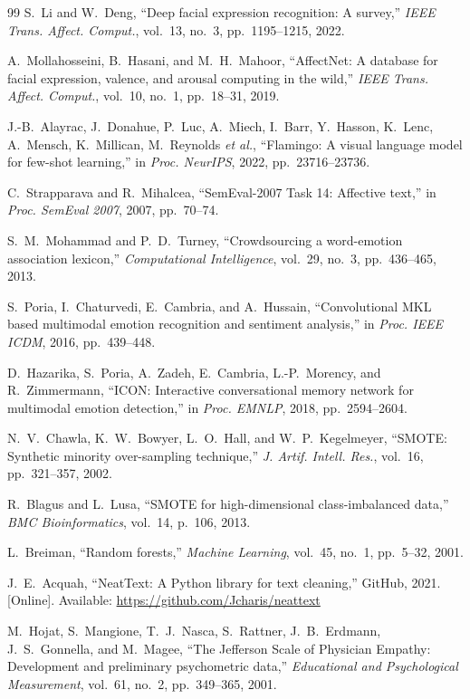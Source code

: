 \documentclass[conference]{IEEEtran}
\begin{document}
\begin{thebibliography}{99}
S.~Li and W.~Deng,
``Deep facial expression recognition: A survey,''
\textit{IEEE Trans. Affect. Comput.}, vol.~13, no.~3,
pp.~1195--1215, 2022.

A.~Mollahosseini, B.~Hasani, and M.~H.~Mahoor,
``AffectNet: A database for facial expression, valence,
and arousal computing in the wild,''
\textit{IEEE Trans. Affect. Comput.}, vol.~10, no.~1,
pp.~18--31, 2019.

J.-B.~Alayrac, J.~Donahue, P.~Luc, A.~Miech,
I.~Barr, Y.~Hasson, K.~Lenc, A.~Mensch, K.~Millican,
M.~Reynolds \textit{et al.},
``Flamingo: A visual language model for few-shot learning,''
in \textit{Proc. NeurIPS}, 2022, pp.~23716--23736.

C.~Strapparava and R.~Mihalcea,
``SemEval-2007 Task 14: Affective text,''
in \textit{Proc. SemEval 2007}, 2007, pp.~70--74.

S.~M.~Mohammad and P.~D.~Turney,
``Crowdsourcing a word-emotion association lexicon,''
\textit{Computational Intelligence}, vol.~29, no.~3,
pp.~436--465, 2013.

S.~Poria, I.~Chaturvedi, E.~Cambria, and A.~Hussain,
``Convolutional MKL based multimodal emotion recognition
and sentiment analysis,''
in \textit{Proc. IEEE ICDM}, 2016, pp.~439--448.

D.~Hazarika, S.~Poria, A.~Zadeh, E.~Cambria,
L.-P.~Morency, and R.~Zimmermann,
``ICON: Interactive conversational memory network for
multimodal emotion detection,''
in \textit{Proc. EMNLP}, 2018, pp.~2594--2604.

N.~V.~Chawla, K.~W.~Bowyer, L.~O.~Hall, and
W.~P.~Kegelmeyer,
``SMOTE: Synthetic minority over-sampling technique,''
\textit{J. Artif. Intell. Res.}, vol.~16,
pp.~321--357, 2002.

R.~Blagus and L.~Lusa,
``SMOTE for high-dimensional class-imbalanced data,''
\textit{BMC Bioinformatics}, vol.~14, p.~106, 2013.

L.~Breiman,
``Random forests,''
\textit{Machine Learning}, vol.~45, no.~1,
pp.~5--32, 2001.

J.~E.~Acquah,
``NeatText: A Python library for text cleaning,''
GitHub, 2021. [Online]. Available:
\url{https://github.com/Jcharis/neattext}

M.~Hojat, S.~Mangione, T.~J.~Nasca, S.~Rattner,
J.~B.~Erdmann, J.~S.~Gonnella, and M.~Magee,
``The Jefferson Scale of Physician Empathy: Development and
preliminary psychometric data,''
\textit{Educational and Psychological Measurement},
vol.~61, no.~2, pp.~349--365, 2001.

\end{thebibliography}
\end{document}
